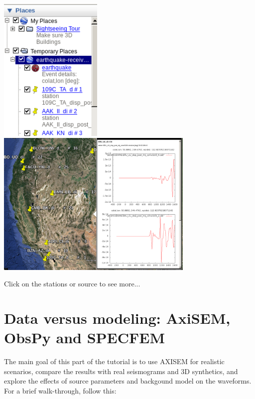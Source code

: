 \documentclass{article}
\begin{document}
\begin{enumerate}
    \begin{center}
    \includegraphics[height=70mm]{google-earth.png}
    \hspace{5mm}
    \includegraphics[height=70mm]{google-earth2.png}
    \end{center}

    Click on the stations or source to see more...

\end{enumerate}



\newpage

\section{Data versus modeling: AxiSEM, ObsPy and SPECFEM}
The main goal of this part of the tutorial is to use AXISEM for realistic scenarios, 
compare the results with real seismograms and 3D synthetics, and 
explore the effects of source parameters and backgound model on the waveforms. 
For a brief walk-through, follow this:
\end{document}
